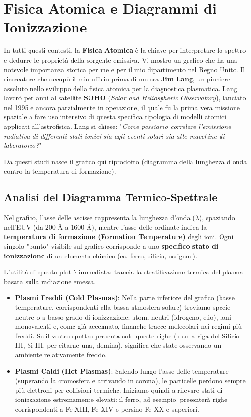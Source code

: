 \section{Fisica Atomica e Diagrammi di Ionizzazione}

In tutti questi contesti, la \textbf{Fisica Atomica} è la chiave per interpretare lo spettro e dedurre le proprietà della sorgente emissiva.
Vi mostro un grafico che ha una notevole importanza storica per me e per il mio dipartimento nel Regno Unito. Il ricercatore che occupò il mio ufficio prima di me era \textbf{Jim Lang}, un pioniere assoluto nello sviluppo della fisica atomica per la diagnostica plasmatica. Lang lavorò per anni al satellite \textbf{SOHO} (\textit{Solar and Heliospheric Observatory}), lanciato nel 1995 e ancora parzialmente in operazione, il quale fu la prima vera missione spaziale a fare uso intensivo di questa specifica tipologia di modelli atomici applicati all'astrofisica.
Lang si chiese: "\textit{Come possiamo correlare l'emissione radiativa di differenti stati ionici sia agli eventi solari sia alle macchine di laboratorio?}"

Da questi studi nasce il grafico qui riprodotto (diagramma della lunghezza d'onda contro la temperatura di formazione).

    \subsection{Analisi del Diagramma Termico-Spettrale}
    
    Nel grafico, l'asse delle ascisse rappresenta la lunghezza d'onda ($\lambda$), spaziando nell'EUV (da $200\text{ \AA}$ a $1600\text{ \AA}$), mentre l'asse delle ordinate indica la \textbf{temperatura di formazione (Formation Temperature)} degli ioni.
    Ogni singolo "punto" visibile sul grafico corrisponde a uno \textbf{specifico stato di ionizzazione} di un elemento chimico (es. ferro, silicio, ossigeno).
    
    L'utilità di questo plot è immediata: traccia la stratificazione termica del plasma basata sulla radiazione emessa.
    \begin{itemize}
        \item \textbf{Plasmi Freddi (Cold Plasmas)}: Nella parte inferiore del grafico (basse temperature, corrispondenti alla bassa atmosfera solare) troviamo specie neutre o a basso grado di ionizzazione: atomi neutri (idrogeno, elio), ioni monovalenti e, come già accennato, finanche tracce molecolari nei regimi più freddi. Se il vostro spettro presenta solo queste righe (o se la riga del Silicio III, Si III, per citarne una, domina), significa che state osservando un ambiente relativamente freddo.
        \item \textbf{Plasmi Caldi (Hot Plasmas)}: Salendo lungo l'asse delle temperature (superando la cromosfera e arrivando in corona), le particelle perdono sempre più elettroni per collisioni termiche. Iniziamo quindi a rilevare stati di ionizzazione estremamente elevati: il ferro, ad esempio, presenterà righe corrispondenti a Fe XIII, Fe XIV o persino Fe XX e superiori.
    \end{itemize}
    
